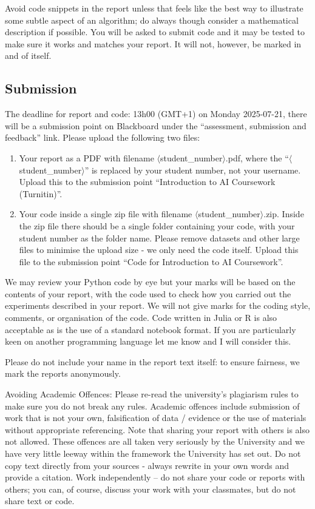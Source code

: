 \documentclass[12pt]{article}
\begin{document}
Avoid code snippets in the report unless that feels like the best way
to illustrate some subtle aspect of an algorithm; do always though
consider a mathematical description if possible. You will be asked to
submit code and it may be tested to make sure it works and matches
your report. It will not, however, be marked in and of itself.

\subsection*{Submission}

The deadline for report and code: 13h00 (GMT+1) on Monday 2025-07-21, there
will be a submission point on Blackboard under the ``assessment,
submission and feedback'' link. Please upload the following two files:
\begin{enumerate}
\item Your report as a PDF with filename $\langle$student\_number$\rangle$.pdf, where the 
  ``$\langle$student\_number$\rangle$'' is replaced by your student number, not your
  username. Upload this to the submission point ``Introduction to AI
  Coursework (Turnitin)''.
\item Your code inside a single zip file with filename
  $\langle$student\_number$\rangle$.zip. Inside the zip file there should be a single
  folder containing your code, with your student number as the folder
  name. Please remove datasets and other large files to minimise the
  upload size - we only need the code itself. Upload this file to the
  submission point ``Code for Introduction to AI Coursework''.
\end{enumerate}
  
We may review your Python code by eye but your marks will be based on
the contents of your report, with the code used to check how you
carried out the experiments described in your report. We will not give
marks for the coding style, comments, or organisation of the
code. Code written in Julia or R is also acceptable as is the use of a
standard notebook format. If you are particularly keen on another
programming language let me know and I will consider this.

Please do not include your name in the report text itself: to ensure
fairness, we mark the reports anonymously.

Avoiding Academic Offences: Please re-read the university's plagiarism
rules to make sure you do not break any rules. Academic offences
include submission of work that is not your own, falsification of data
/ evidence or the use of materials without appropriate
referencing. Note that sharing your report with others is also not
allowed. These offences are all taken very seriously by the University
and we have very little leeway within the framework the University has
set out. Do not copy text directly from your sources - always rewrite
in your own words and provide a citation. Work independently -- do not
share your code or reports with others; you can, of course, discuss
your work with your classmates, but do not share text or code.
\end{document}
